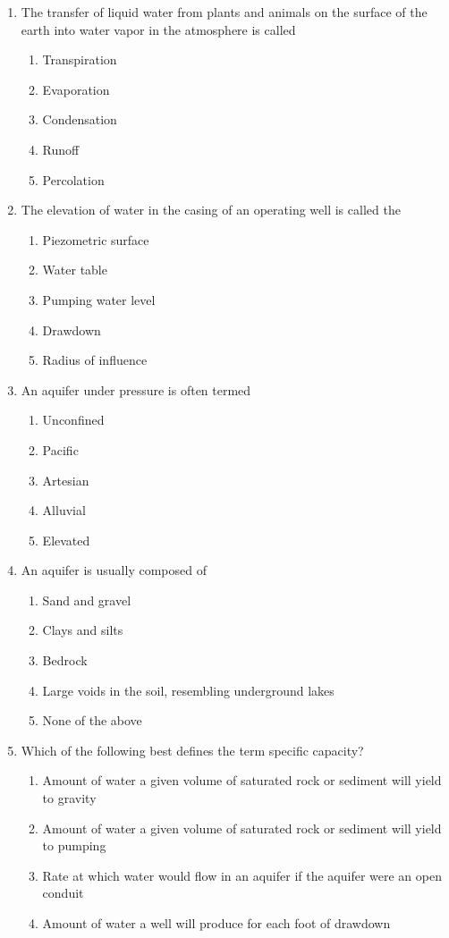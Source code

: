 \begin{enumerate}
\item The transfer of liquid water from plants and animals on the surface of the earth into water vapor in the atmosphere is called
\begin{enumerate}
\item Transpiration
\item Evaporation
\item Condensation
\item Runoff
\item Percolation
\end{enumerate}

\item The elevation of water in the casing of an operating well is called the
\begin{enumerate}
\item Piezometric surface
\item Water table
\item Pumping water level
\item Drawdown
\item Radius of influence
\end{enumerate}

\item An aquifer under pressure is often termed
\begin{enumerate}
\item Unconfined
\item Pacific
\item Artesian
\item Alluvial
\item Elevated
\end{enumerate}

\item An aquifer is usually composed of
\begin{enumerate}
\item Sand and gravel 
\item Clays and silts
\item Bedrock
\item Large voids in the soil, resembling underground lakes
\item None of the above
\end{enumerate}

\item Which of the following best defines the term specific capacity?
\begin{enumerate}
\item Amount of water a given volume of saturated rock or sediment will yield to gravity
\item Amount of water a given volume of saturated rock or sediment will yield to pumping
\item Rate at which water would flow in an aquifer if the aquifer were an open conduit
\item Amount of water a well will produce for each foot of drawdown
\end{enumerate}


\end{enumerate}
